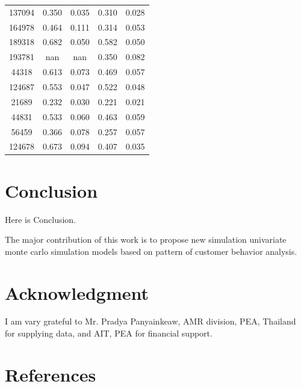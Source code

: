 \documentclass[conference]{IEEEtran}
\begin{document}
\begin{table}[]
\begin{center}
\begin{tabular}{ccccc}
137094 & 0.350 & 0.035 & 0.310 & 0.028 \\
164978 & 0.464 & 0.111 & 0.314 & 0.053 \\
189318 & 0.682 & 0.050 & 0.582 & 0.050 \\
193781 & nan & nan & 0.350 & 0.082 \\
44318 & 0.613 & 0.073 & 0.469 & 0.057 \\
124687 & 0.553 & 0.047 & 0.522 & 0.048 \\
21689 & 0.232 & 0.030 & 0.221 & 0.021 \\
44831 & 0.533 & 0.060 & 0.463 & 0.059 \\
56459 & 0.366 & 0.078 & 0.257 & 0.057 \\
124678 & 0.673 & 0.094 & 0.407 & 0.035 \\
  \hline
  \end{tabular}
  \label{tab.res_LF_working_day}
  \end{center}
\end{table}


\section{Conclusion}
Here is Conclusion.

The major contribution of this work is to propose new simulation univariate monte carlo simulation models based on pattern of customer behavior analysis.


\section*{Acknowledgment}
I am vary grateful to Mr. Pradya Panyainkeaw, AMR division, PEA, Thailand for supplying data, and AIT, PEA for financial support.


\section*{References}
\end{document}
